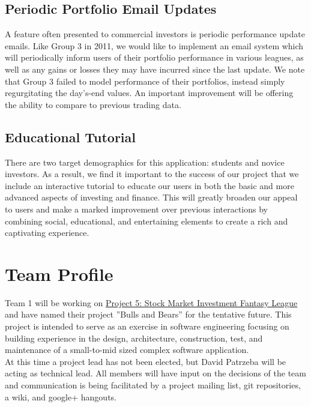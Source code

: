 \documentclass[11pt,letterpaper,oneside]{memoir}
\begin{document}
\section{Periodic Portfolio Email Updates}

A feature often presented to commercial investors is periodic performance update emails.
Like Group 3 in 2011, we would like to implement an email system which
will periodically inform users of their portfolio performance in various leagues, as well
as any gains or losses they may have incurred since the last update. We note that Group 3
failed to model performance of their portfolios, instead simply regurgitating the day's-end
values. An important improvement will be offering the ability to compare to previous trading
data.

\section{Educational Tutorial}

There are two target demographics for this application: students and novice investors. As a
result, we find it important to the success of our project that we include an interactive
tutorial to educate our users in both the basic and more advanced aspects of investing
and finance. This will greatly broaden our appeal to users and make a marked improvement over
previous interactions by combining social, educational, and entertaining elements to create
a rich and captivating experience.

\chapter{Team Profile}

Team 1 will be working on \href{http://ece.rutgers.edu/~marsic/books/SE/projects/}
{Project 5: Stock Market Investment Fantasy League} and have named their project
''Bulls and Bears'' for the tentative future. This project is intended to serve
as an exercise in software engineering focusing on building experience in the design,
architecture, construction, test, and maintenance of a small-to-mid sized complex
software application.\\

At this time a project lead has not been elected, but David Patrzeba will be acting
as technical lead.  All members will have input on the decisions of the team and
communication is being facilitated by a project mailing list, git repositories,
a wiki, and google+ hangouts.\\
\end{document}
